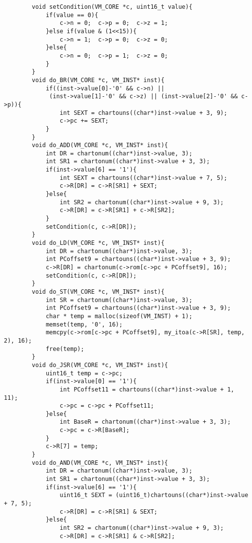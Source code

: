 \documentclass[20pt]{ctexart}
\begin{document}
\begin{verbatim}
        void setCondition(VM_CORE *c, uint16_t value){
            if(value == 0){
                c->n = 0;  c->p = 0;  c->z = 1;
            }else if(value & (1<<15)){
                c->n = 1;  c->p = 0;  c->z = 0;
            }else{
                c->n = 0;  c->p = 1;  c->z = 0;
            }
        }
        void do_BR(VM_CORE *c, VM_INST* inst){
            if((inst->value[0]-'0' && c->n) || 
             (inst->value[1]-'0' && c->z) || (inst->value[2]-'0' && c->p)){
                int SEXT = chartouns((char*)inst->value + 3, 9);
                c->pc += SEXT;
            }
        }
        void do_ADD(VM_CORE *c, VM_INST* inst){   
            int DR = chartonum((char*)inst->value, 3);
            int SR1 = chartonum((char*)inst->value + 3, 3);
            if(inst->value[6] == '1'){
                int SEXT = chartouns((char*)inst->value + 7, 5);
                c->R[DR] = c->R[SR1] + SEXT;
            }else{
                int SR2 = chartonum((char*)inst->value + 9, 3);
                c->R[DR] = c->R[SR1] + c->R[SR2];
            }
            setCondition(c, c->R[DR]);
        }
        void do_LD(VM_CORE *c, VM_INST* inst){
            int DR = chartonum((char*)inst->value, 3);
            int PCoffset9 = chartouns((char*)inst->value + 3, 9);
            c->R[DR] = chartonum(c->rom[c->pc + PCoffset9], 16);
            setCondition(c, c->R[DR]);
        }
        void do_ST(VM_CORE *c, VM_INST* inst){
            int SR = chartonum((char*)inst->value, 3);
            int PCoffset9 = chartouns((char*)inst->value + 3, 9);
            char * temp = malloc(sizeof(VM_INST) + 1);
            memset(temp, '0', 16);
            memcpy(c->rom[c->pc + PCoffset9], my_itoa(c->R[SR], temp, 2), 16);
            free(temp);
        }
        void do_JSR(VM_CORE *c, VM_INST* inst){
            uint16_t temp = c->pc;
            if(inst->value[0] == '1'){
                int PCoffset11 = chartouns((char*)inst->value + 1, 11);
                c->pc = c->pc + PCoffset11;
            }else{
                int BaseR = chartonum((char*)inst->value + 3, 3);
                c->pc = c->R[BaseR];
            }
            c->R[7] = temp;
        }
        void do_AND(VM_CORE *c, VM_INST* inst){
            int DR = chartonum((char*)inst->value, 3);
            int SR1 = chartonum((char*)inst->value + 3, 3);
            if(inst->value[6] == '1'){
                uint16_t SEXT = (uint16_t)chartouns((char*)inst->value + 7, 5);
                c->R[DR] = c->R[SR1] & SEXT;
            }else{
                int SR2 = chartonum((char*)inst->value + 9, 3);
                c->R[DR] = c->R[SR1] & c->R[SR2];

\end{verbatim}
\end{document}
